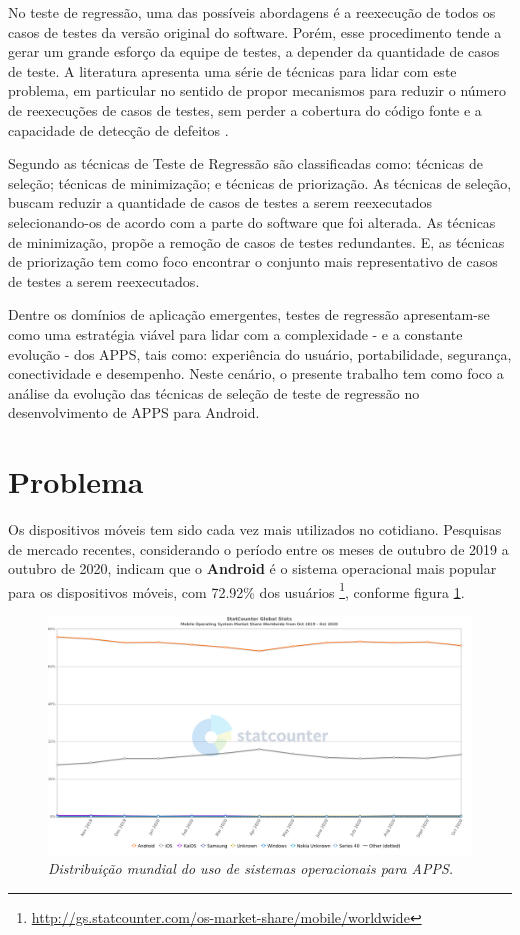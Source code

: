 No teste de regressão, uma das possíveis abordagens é a reexecução de todos os casos de testes da versão original do software. Porém, esse procedimento tende a gerar um grande esforço da equipe de testes, a depender da quantidade de casos de teste. A literatura apresenta uma série de técnicas para lidar com este problema, em particular no sentido de propor mecanismos para reduzir o número de reexecuções de casos de testes, sem perder a cobertura do código fonte e a capacidade de detecção de defeitos  \cite{Graves:2001:ESR:367008.367020,ENGSTROM201014,KAZMI2017,ROMANO201862}.

Segundo  as técnicas de Teste de Regressão são classificadas como: técnicas de seleção; técnicas de minimização; e técnicas de priorização. As técnicas de seleção, buscam reduzir a quantidade de casos de testes a serem reexecutados selecionando-os de acordo com a parte do software que foi alterada. As técnicas de minimização, propõe a remoção de casos de testes redundantes. E, as técnicas de priorização tem como foco encontrar o conjunto mais representativo de casos de testes a serem reexecutados.

Dentre os domínios de aplicação emergentes, testes de regressão apresentam-se como uma estratégia viável para lidar com a complexidade - e a constante evolução - dos \ac{APPS}, tais como: experiência do usuário, portabilidade, segurança, conectividade e desempenho. Neste cenário, o presente trabalho tem como foco a análise da evolução das técnicas de seleção de teste de regressão no desenvolvimento de \ac{APPS} para Android.

\section{Problema}\label{sec:problema}

Os dispositivos móveis tem sido cada vez mais utilizados no cotidiano. Pesquisas de mercado recentes, considerando o período entre os meses de outubro de 2019 a outubro de 2020, indicam que o \textbf{Android} é o sistema operacional mais popular para os dispositivos móveis, com 72.92\% dos usuários \footnote{\url{http://gs.statcounter.com/os-market-share/mobile/worldwide}}, conforme figura \ref{figure:usuariosAndroid}.

\begin{figure}[!htb]
\centering
\includegraphics[width=.8\textwidth]{images/usuariosAndroid.png}
\caption{\textit{Distribuição mundial do uso de sistemas operacionais para \ac{APPS}.}}
\label{figure:usuariosAndroid}
\end{figure}

